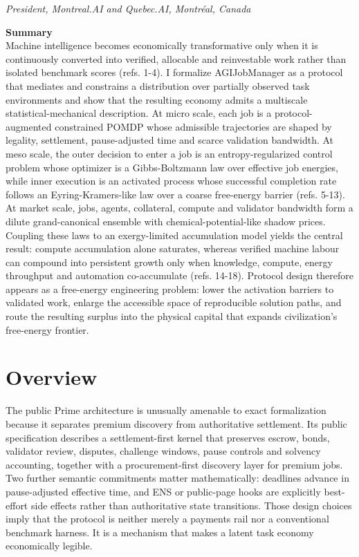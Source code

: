 \emph{President, Montreal.AI and Quebec.AI, Montréal, Canada}

\textbf{Summary}\\
Machine intelligence becomes economically transformative only when it is
continuously converted into verified, allocable and reinvestable work
rather than isolated benchmark scores (refs. 1-4). I formalize
AGIJobManager as a protocol that mediates and constrains a distribution
over partially observed task environments and show that the resulting
economy admits a multiscale statistical-mechanical description. At micro
scale, each job is a protocol-augmented constrained POMDP whose
admissible trajectories are shaped by legality, settlement,
pause-adjusted time and scarce validation bandwidth. At meso scale, the
outer decision to enter a job is an entropy-regularized control problem
whose optimizer is a Gibbs-Boltzmann law over effective job energies,
while inner execution is an activated process whose successful
completion rate follows an Eyring-Kramers-like law over a coarse
free-energy barrier (refs. 5-13). At market scale, jobs, agents,
collateral, compute and validator bandwidth form a dilute
grand-canonical ensemble with chemical-potential-like shadow prices.
Coupling these laws to an exergy-limited accumulation model yields the
central result: compute accumulation alone saturates, whereas verified
machine labour can compound into persistent growth only when knowledge,
compute, energy throughput and automation co-accumulate (refs. 14-18).
Protocol design therefore appears as a free-energy engineering problem:
lower the activation barriers to validated work, enlarge the accessible
space of reproducible solution paths, and route the resulting surplus
into the physical capital that expands civilization's free-energy
frontier.

\section{Overview}\label{overview}

The public Prime architecture is unusually amenable to exact
formalization because it separates premium discovery from authoritative
settlement. Its public specification describes a settlement-first kernel
that preserves escrow, bonds, validator review, disputes, challenge
windows, pause controls and solvency accounting, together with a
procurement-first discovery layer for premium jobs. Two further semantic
commitments matter mathematically: deadlines advance in pause-adjusted
effective time, and ENS or public-page hooks are explicitly best-effort
side effects rather than authoritative state transitions. Those design
choices imply that the protocol is neither merely a payments rail nor a
conventional benchmark harness. It is a mechanism that makes a latent
task economy economically legible.


